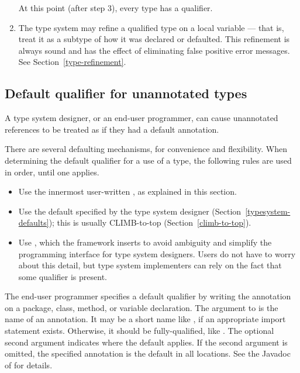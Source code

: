 \begin{enumerate}
  \smallskip

  At this point (after step 3), every type has a qualifier.

\item
  The type system may refine a qualified type on a local variable --- that
  is, treat it as a subtype of how it was declared or defaulted.  This
  refinement is always sound and has the effect of eliminating false
  positive error messages.  See Section~\ref{type-refinement}.


\end{enumerate}



\subsection{Default qualifier for unannotated types\label{defaults}}

A type system designer, or an end-user programmer, can cause unannotated
references to be treated as if they had a default annotation.

There are several defaulting mechanisms, for convenience and flexibility.
When determining the default qualifier for a use of a type, the following
rules are used in order, until one applies.
\begin{itemize}
\item
  Use the innermost user-written , as explained in
  this section.
\item
  Use the default specified by the type system designer
  (Section~\ref{typesystem-defaults});
  this is usually CLIMB-to-top (Section~\ref{climb-to-top}).
\item
  Use , which the framework
  inserts to avoid ambiguity and simplify the programming interface for
  type system designers.  Users do not have to worry about this detail,
  but type system implementers can rely on the fact that some
  qualifier is present.
\end{itemize}



The end-user programmer specifies a default qualifier by writing the 
annotation on a package, class, method, or variable declaration.  The
argument to  is the 
name of an annotation.  It may be a short name like , if an
appropriate import statement exists.  Otherwise, it should be
fully-qualified, like .
The optional second argument indicates where the default
applies.  If the second argument is omitted, the specified annotation is
the default in all locations.  See the Javadoc of  for details.

